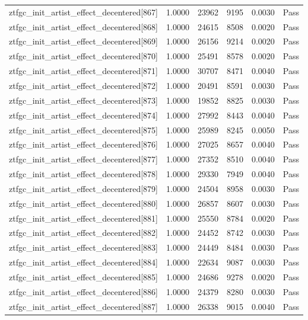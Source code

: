 \begin{table}[htbp]
\begin{tabular}{llrrll}
ztfgc\_init\_artist\_effect\_decentered[867] & 1.0000 & 23962 & 9195 & 0.0030 & Pass \\
ztfgc\_init\_artist\_effect\_decentered[868] & 1.0000 & 24615 & 8508 & 0.0020 & Pass \\
ztfgc\_init\_artist\_effect\_decentered[869] & 1.0000 & 26156 & 9214 & 0.0020 & Pass \\
ztfgc\_init\_artist\_effect\_decentered[870] & 1.0000 & 25491 & 8578 & 0.0020 & Pass \\
ztfgc\_init\_artist\_effect\_decentered[871] & 1.0000 & 30707 & 8471 & 0.0040 & Pass \\
ztfgc\_init\_artist\_effect\_decentered[872] & 1.0000 & 20491 & 8591 & 0.0030 & Pass \\
ztfgc\_init\_artist\_effect\_decentered[873] & 1.0000 & 19852 & 8825 & 0.0030 & Pass \\
ztfgc\_init\_artist\_effect\_decentered[874] & 1.0000 & 27992 & 8443 & 0.0040 & Pass \\
ztfgc\_init\_artist\_effect\_decentered[875] & 1.0000 & 25989 & 8245 & 0.0050 & Pass \\
ztfgc\_init\_artist\_effect\_decentered[876] & 1.0000 & 27025 & 8657 & 0.0040 & Pass \\
ztfgc\_init\_artist\_effect\_decentered[877] & 1.0000 & 27352 & 8510 & 0.0040 & Pass \\
ztfgc\_init\_artist\_effect\_decentered[878] & 1.0000 & 29330 & 7949 & 0.0040 & Pass \\
ztfgc\_init\_artist\_effect\_decentered[879] & 1.0000 & 24504 & 8958 & 0.0030 & Pass \\
ztfgc\_init\_artist\_effect\_decentered[880] & 1.0000 & 26857 & 8607 & 0.0030 & Pass \\
ztfgc\_init\_artist\_effect\_decentered[881] & 1.0000 & 25550 & 8784 & 0.0020 & Pass \\
ztfgc\_init\_artist\_effect\_decentered[882] & 1.0000 & 24452 & 8742 & 0.0030 & Pass \\
ztfgc\_init\_artist\_effect\_decentered[883] & 1.0000 & 24449 & 8484 & 0.0030 & Pass \\
ztfgc\_init\_artist\_effect\_decentered[884] & 1.0000 & 22634 & 9087 & 0.0030 & Pass \\
ztfgc\_init\_artist\_effect\_decentered[885] & 1.0000 & 24686 & 9278 & 0.0020 & Pass \\
ztfgc\_init\_artist\_effect\_decentered[886] & 1.0000 & 24379 & 8280 & 0.0030 & Pass \\
ztfgc\_init\_artist\_effect\_decentered[887] & 1.0000 & 26338 & 9015 & 0.0040 & Pass \\

\end{tabular}
\end{table}
